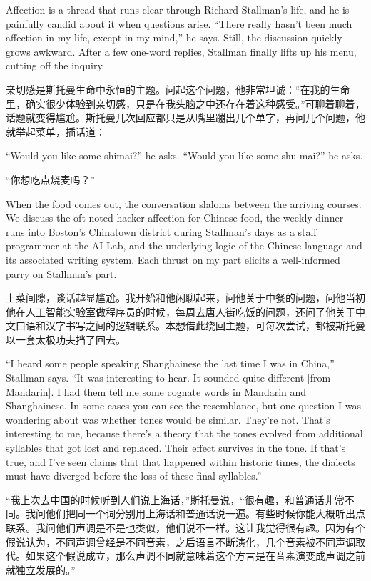 \ifdefined\eng
Affection is a thread that runs clear through Richard Stallman's life, and he is painfully candid about it when questions arise. ``There really hasn't been much affection in my life, except in my mind,'' he says. Still, the discussion quickly grows awkward. After a few one-word replies, Stallman finally lifts up his menu, cutting off the inquiry.
\fi

\ifdefined\chs
亲切感是斯托曼生命中永恒的主题。问起这个问题，他非常坦诚：``在我的生命里，确实很少体验到亲切感，只是在我头脑之中还存在着这种感受。''可聊着聊着，话题就变得尴尬。斯托曼几次回应都只是从嘴里蹦出几个单字，再问几个问题，他就举起菜单，插话道：
\fi

\ifdefined\eng
\ifdefined\vone
``Would you like some shimai?'' he asks.
\fi
\ifdefined\vtwo
``Would you like some shu mai?'' he asks.
\fi
\fi

\ifdefined\chs
``你想吃点烧麦吗？''
\fi

\ifdefined\eng
When the food comes out, the conversation slaloms between the arriving courses. We discuss the oft-noted hacker affection for Chinese food, the weekly dinner runs into Boston's Chinatown district during Stallman's days as a staff programmer at the AI Lab, and the underlying logic of the Chinese language and its associated writing system. Each thrust on my part elicits a well-informed parry on Stallman's part.
\fi

\ifdefined\chs
上菜间隙，谈话越显尴尬。我开始和他闲聊起来，问他关于中餐的问题，问他当初他在人工智能实验室做程序员的时候，每周去唐人街吃饭的问题，还问了他关于中文口语和汉字书写之间的逻辑联系。本想借此绕回主题，可每次尝试，都被斯托曼以一套太极功夫挡了回去。
\fi

\ifdefined\eng
``I heard some people speaking Shanghainese the last time I was in China,'' Stallman says. ``It was interesting to hear. It sounded quite different [from Mandarin]. I had them tell me some cognate words in Mandarin and Shanghainese. In some cases you can see the resemblance, but one question I was wondering about was whether tones would be similar. They're not. That's interesting to me, because there's a theory that the tones evolved from additional syllables that got lost and replaced. Their effect survives in the tone. If that's true, and I've seen claims that that happened within historic times, the dialects must have diverged before the loss of these final syllables.''
\fi

\ifdefined\chs
``我上次去中国的时候听到人们说上海话，''斯托曼说，``很有趣，和普通话非常不同。我问他们把同一个词分别用上海话和普通话说一遍。有些时候你能大概听出点联系。我问他们声调是不是也类似，他们说不一样。这让我觉得很有趣。因为有个假说认为，不同声调曾经是不同音素，之后语言不断演化，几个音素被不同声调取代。如果这个假说成立，那么声调不同就意味着这个方言是在音素演变成声调之前就独立发展的。''
\fi

